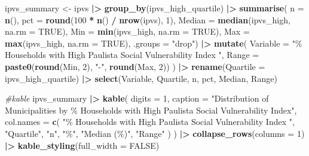 \documentclass[
]{article}
\newenvironment{Shaded}{\begin{snugshade}}{\end{snugshade}}
\newcommand{\AttributeTok}[1]{\textcolor[rgb]{0.13,0.29,0.53}{#1}}
\newcommand{\CommentTok}[1]{\textcolor[rgb]{0.56,0.35,0.01}{\textit{#1}}}
\newcommand{\ConstantTok}[1]{\textcolor[rgb]{0.56,0.35,0.01}{#1}}
\newcommand{\DecValTok}[1]{\textcolor[rgb]{0.00,0.00,0.81}{#1}}
\newcommand{\FunctionTok}[1]{\textcolor[rgb]{0.13,0.29,0.53}{\textbf{#1}}}
\newcommand{\NormalTok}[1]{#1}
\newcommand{\OtherTok}[1]{\textcolor[rgb]{0.56,0.35,0.01}{#1}}
\newcommand{\SpecialCharTok}[1]{\textcolor[rgb]{0.81,0.36,0.00}{\textbf{#1}}}
\newcommand{\StringTok}[1]{\textcolor[rgb]{0.31,0.60,0.02}{#1}}
\begin{document}
\begin{Shaded}
\begin{Highlighting}[]
\NormalTok{ipvs\_summary }\OtherTok{\textless{}{-}}\NormalTok{ ipvs }\SpecialCharTok{|\textgreater{}}
  \FunctionTok{group\_by}\NormalTok{(ipvs\_high\_quartile) }\SpecialCharTok{|\textgreater{}}
  \FunctionTok{summarise}\NormalTok{(}
    \AttributeTok{n =} \FunctionTok{n}\NormalTok{(),}
    \AttributeTok{pct =} \FunctionTok{round}\NormalTok{(}\DecValTok{100} \SpecialCharTok{*} \FunctionTok{n}\NormalTok{() }\SpecialCharTok{/} \FunctionTok{nrow}\NormalTok{(ipvs), }\DecValTok{1}\NormalTok{),}
    \AttributeTok{Median =} \FunctionTok{median}\NormalTok{(ipvs\_high, }\AttributeTok{na.rm =} \ConstantTok{TRUE}\NormalTok{),}
    \AttributeTok{Min =} \FunctionTok{min}\NormalTok{(ipvs\_high, }\AttributeTok{na.rm =} \ConstantTok{TRUE}\NormalTok{),}
    \AttributeTok{Max =} \FunctionTok{max}\NormalTok{(ipvs\_high, }\AttributeTok{na.rm =} \ConstantTok{TRUE}\NormalTok{),}
    \AttributeTok{.groups =} \StringTok{"drop"}\NormalTok{) }\SpecialCharTok{|\textgreater{}}
  \FunctionTok{mutate}\NormalTok{(}
    \AttributeTok{Variable =} \StringTok{"\% Households with High Paulista Social Vulnerability Index "}\NormalTok{,}
    \AttributeTok{Range =} \FunctionTok{paste0}\NormalTok{(}\FunctionTok{round}\NormalTok{(Min, }\DecValTok{2}\NormalTok{), }\StringTok{"{-}"}\NormalTok{, }\FunctionTok{round}\NormalTok{(Max, }\DecValTok{2}\NormalTok{)) ) }\SpecialCharTok{|\textgreater{}}
  \FunctionTok{rename}\NormalTok{(}\AttributeTok{Quartile =}\NormalTok{ ipvs\_high\_quartile) }\SpecialCharTok{|\textgreater{}}
  \FunctionTok{select}\NormalTok{(Variable, Quartile, n, pct, Median, Range)}

\CommentTok{\#kable}
\NormalTok{ipvs\_summary }\SpecialCharTok{|\textgreater{}}
  \FunctionTok{kable}\NormalTok{(}
    \AttributeTok{digits =} \DecValTok{1}\NormalTok{,}
    \AttributeTok{caption =} \StringTok{"Distribution of Municipalities by \% Households with High Paulista Social Vulnerability Index"}\NormalTok{,}
    \AttributeTok{col.names =} \FunctionTok{c}\NormalTok{(}
      \StringTok{"\% Households with High Paulista Social Vulnerability Index "}\NormalTok{,}
      \StringTok{"Quartile"}\NormalTok{,}
      \StringTok{"n"}\NormalTok{,}
      \StringTok{"\%"}\NormalTok{,}
      \StringTok{"Median (\%)"}\NormalTok{,}
      \StringTok{"Range"}
\NormalTok{    )}
\NormalTok{  ) }\SpecialCharTok{|\textgreater{}}
  \FunctionTok{collapse\_rows}\NormalTok{(}\AttributeTok{columns =} \DecValTok{1}\NormalTok{) }\SpecialCharTok{|\textgreater{}}
  \FunctionTok{kable\_styling}\NormalTok{(}\AttributeTok{full\_width =} \ConstantTok{FALSE}\NormalTok{)}
\end{Highlighting}
\end{Shaded}
\end{document}

